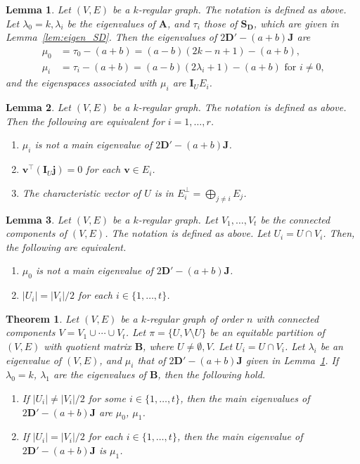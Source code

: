 \documentclass[10pt,a4paper]{amsart}
\newtheorem{lemma}{Lemma}
\newtheorem{theorem}{Theorem}
\newcommand{\A}{\boldsymbol{A}}
\newcommand{\B}{\boldsymbol{B}}
\newcommand{\D}{\boldsymbol{D}}
\newcommand{\I}{\boldsymbol{I}}
\newcommand{\J}{\boldsymbol{J}}
\newcommand{\Sm}{\boldsymbol{S}}
\newcommand{\jv}{\boldsymbol{j}}
\newcommand{\vv}{\boldsymbol{v}}
\begin{document}
\begin{lemma} \label{lem:eigen_2D'}
Let $(V,E)$ be a $k$-regular graph. The notation is defined as above. 
Let $\lambda_0=k,\lambda_i$ be the eigenvalues of $\A$, 
and $\tau_i$ those of $\Sm_{\D}$, which are given in  Lemma~\ref{lem:eigen_SD}. 
Then the eigenvalues of $2\D'-(a+b)\J$ are  
\begin{align*}%
\mu_0&=\tau_0-(a+b)=(a-b)(2k-n+1)-(a+b),\\ %
\mu_i&=\tau_i-(a+b)=(a-b)(2\lambda_i+1)-(a+b) \text{ for $i\ne 0$,}
\end{align*}
 and the eigenspaces associated with $\mu_i$ are $\I_U E_i$. 
\end{lemma}

\begin{lemma} \label{lem:switch_main}
Let $(V,E)$ be a $k$-regular graph. The notation is defined as above. 
Then the following are equivalent for $i= 1,\ldots,r$.  
\begin{enumerate}
\item $\mu_i$ is not a main eigenvalue of $2\D'-(a+b)\J$. 
\item $\vv^\top(\I_U\jv) = 0$ for each $\vv \in E_i$.
\item The characteristic vector of $U$ is in 
$E_i^\perp =\bigoplus_{ j \ne i} E_j$. 
\end{enumerate}
\end{lemma}

\begin{lemma} \label{lem:mu_0_main}
Let $(V,E)$ be a $k$-regular graph. 
Let $V_1,\ldots, V_t$ be the connected components of $(V,E)$.  
The notation is defined as above. 
Let $U_i=U \cap V_i $. 
Then, the following are equivalent.
\begin{enumerate}
    \item $\mu_0$ is not a main eigenvalue of $2\D'-(a+b)\J$. 
    \item $|U_i|=|V_i|/2$ for each $i \in \{1,\ldots, t\}$. 
\end{enumerate} 
\end{lemma}

\begin{theorem} \label{thm:regular_angle}
Let $(V,E)$ be a $k$-regular graph of order $n$ with connected components $V=V_1\cup \cdots \cup V_t$. 
Let $\pi=\{U, V\setminus U\}$ be an equitable partition of $(V,E)$ with quotient matrix $\B$, where $U\ne \emptyset,V$. Let $U_i=U \cap V_i$. 
Let $\lambda_i$ be an eigenvalue of $(V,E)$, and $\mu_i$ that of  $2\D'-(a+b)\J$ given in Lemma~\ref{lem:eigen_2D'}. 
If $\lambda_0=k$, $\lambda_1$ are the eigenvalues of $\B$,   
then the following hold.
 \begin{enumerate}
\item If $|U_i|\ne |V_i|/2$ for some $i\in \{1,\ldots, t\}$, then the main eigenvalues of $2\D'-(a+b)\J$ are $\mu_0$, $\mu_1$. 
\item If $|U_i|= |V_i|/2$ for each $i \in \{1, \ldots, t\}$, then the main eigenvalue of $2 \D'-(a+b)\J$ is $\mu_1$. 
\end{enumerate}
\end{theorem}
\end{document}
